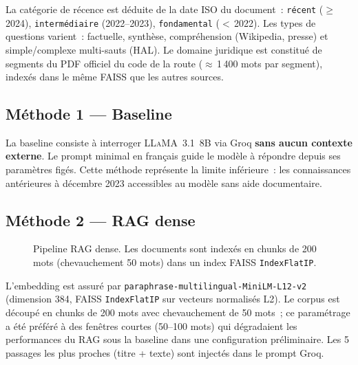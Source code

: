 \documentclass[10pt,journal,compsoc]{IEEEtran}
\begin{document}
La catégorie de récence est déduite de la date ISO du document~:
\texttt{récent} ($\geq$\,2024), \texttt{intermédiaire} (2022--2023),
\texttt{fondamental} ($<$\,2022). Les types de questions varient~:
factuelle, synthèse, compréhension (Wikipedia, presse) et
simple/complexe multi-sauts (HAL). Le domaine juridique est constitué
de segments du PDF officiel du code de la route ($\approx$\,1\,400 mots
par segment), indexés dans le même FAISS que les autres sources.

\subsection{Méthode 1 --- Baseline}

La baseline consiste à interroger \textsc{LLaMA}~3.1~8B via Groq
\textbf{sans aucun contexte externe}. Le prompt minimal en français
guide le modèle à répondre depuis ses paramètres figés. Cette méthode
représente la limite inférieure~: les connaissances antérieures à
décembre 2023 accessibles au modèle sans aide documentaire.

\subsection{Méthode 2 --- RAG dense}

\begin{figure}[H]
  \centering
  \caption{Pipeline RAG dense. Les documents sont indexés en chunks
           de 200 mots (chevauchement 50 mots) dans un index FAISS
           \texttt{IndexFlatIP}.}
  \label{fig:rag}
\end{figure}

L'embedding est assuré par
\texttt{paraphrase-multilingual-MiniLM-L12-v2} (dimension 384,
FAISS \texttt{IndexFlatIP} sur vecteurs normalisés L2). Le corpus est
découpé en chunks de 200 mots avec chevauchement de 50 mots~; ce
paramétrage a été préféré à des fenêtres courtes (50--100 mots) qui
dégradaient les performances du RAG sous la baseline dans une
configuration préliminaire. Les 5 passages les plus proches
(titre + texte) sont injectés dans le prompt Groq.
\end{document}
